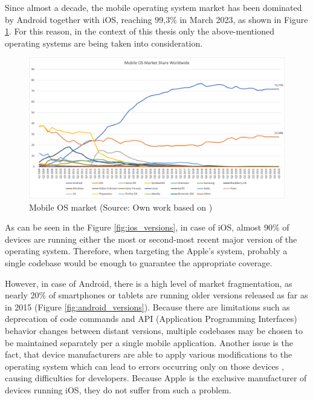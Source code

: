 Since almost a decade, the mobile operating system market has been dominated by Android together with iOS, reaching 99,3\% in March 2023, as shown in Figure \ref{fig:mobile_os_market}. For this reason, in the context of this thesis only the above-mentioned operating systems are being taken into consideration.

\begin{figure}[h]
  \centering
  \includegraphics[width=\textwidth]{img/mobile_os_market}
  \caption{Mobile OS market (Source: Own work based on \cite{statcounter_mobile_os_market})}
  \label{fig:mobile_os_market}
\end{figure}

As can be seen in the Figure \ref{fig:ios_versions}, in case of iOS, almost 90\% of devices are running either the most or second-most recent major version of the operating system. Therefore, when targeting the Apple's system, probably a single codebase would be enough to guarantee the appropriate coverage.

However, in case of Android, there is a high level of market fragmentation, as nearly 20\% of smartphones or tablets are running older versions released as far as in 2015 (Figure \ref{fig:android_versions}). Because there are limitations such as deprecation of code commands and API (Application Programming Interfaces) behavior changes between distant versions, multiple codebases may be chosen to be maintained separately per a single mobile application. Another issue is the fact, that device manufacturers are able to apply various modifications to the operating system which can lead to errors occurring only on those devices \cite{comparison_technologies_multiplatform}, causing difficulties for developers. Because Apple is the exclusive manufacturer of devices running iOS, they do not suffer from such a problem. 

